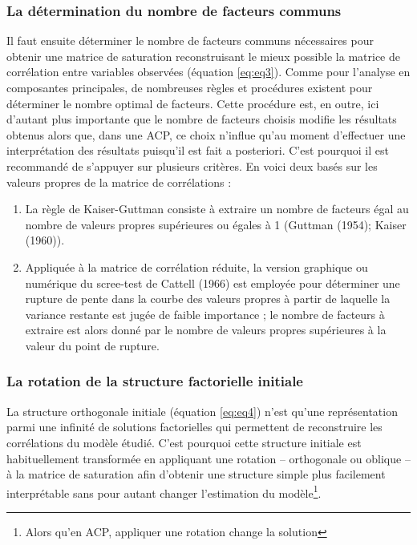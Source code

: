 \documentclass[12pt,a4paper]{reedthesis}
\begin{document}
\hypertarget{la-duxe9termination-du-nombre-de-facteurs-communs}{%
\subsubsection{La détermination du nombre de facteurs communs}\label{la-duxe9termination-du-nombre-de-facteurs-communs}}

Il faut ensuite déterminer le nombre de facteurs communs nécessaires pour obtenir une matrice de saturation reconstruisant le mieux possible la matrice de corrélation entre variables observées (équation \eqref{eq:eq3}). Comme pour l'analyse en composantes principales, de nombreuses règles et procédures existent pour déterminer le nombre optimal de facteurs. Cette procédure est, en outre, ici d'autant plus importante que le nombre de facteurs choisis modifie les résultats obtenus alors que, dans une ACP, ce choix n'influe qu'au moment d'effectuer une interprétation des résultats puisqu'il est fait a posteriori. C'est pourquoi il est recommandé de s'appuyer sur plusieurs critères. En voici deux basés sur les valeurs propres de la matrice de corrélations :
\begin{enumerate}
\def\labelenumi{\arabic{enumi}.}
\item
  La règle de Kaiser-Guttman consiste à extraire un nombre de facteurs égal au nombre de valeurs propres supérieures ou égales à 1 (Guttman (1954); Kaiser (1960)).
\item
  Appliquée à la matrice de corrélation réduite, la version graphique ou numérique du scree-test de Cattell (1966) est employée pour déterminer une rupture de pente dans la courbe des valeurs propres à partir de laquelle la variance restante est jugée de faible importance ; le nombre de facteurs à extraire est alors donné par le nombre de valeurs propres supérieures à la valeur du point de rupture.
\end{enumerate}
\hypertarget{sec:annexeAFrotation}{%
\subsubsection{La rotation de la structure factorielle initiale}\label{sec:annexeAFrotation}}

La structure orthogonale initiale (équation \eqref{eq:eq4}) n'est qu'une représentation parmi une infinité de solutions factorielles qui permettent de reconstruire les corrélations du modèle étudié. C'est pourquoi cette structure initiale est habituellement transformée en appliquant une rotation -- orthogonale ou oblique -- à la matrice de saturation afin d'obtenir une structure simple plus facilement interprétable sans pour autant changer l'estimation du modèle\footnote{Alors qu'en ACP, appliquer une rotation change la solution}.
\end{document}

